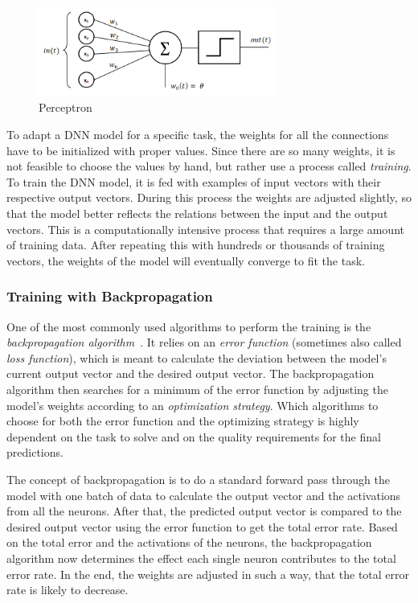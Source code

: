 \begin{figure}[h]
    \centering
    \includegraphics[width=0.7\textwidth]{images/perceptron}
    \caption{Perceptron}
    \label{fig:perceptron}
\end{figure}

To adapt a DNN model for a specific task, the weights for all the connections have to be initialized with proper values. Since there are so many weights, it is not feasible to choose the values by hand, but rather use a process called \emph{training}. To train the DNN model, it is fed with examples of input vectors with their respective output vectors. During this process the weights are adjusted slightly, so that the model better reflects the relations between the input and the output vectors. This is a computationally intensive process that requires a large amount of training data. After repeating this with hundreds or thousands of training vectors, the weights of the model will eventually converge to fit the task.

\subsubsection{Training with Backpropagation}
One of the most commonly used algorithms to perform the training is the \emph{backpropagation algorithm}~\cite[pp.~151ff]{nn_intro96}. It relies on an \emph{error function} (sometimes also called \emph{loss function}), which is meant to calculate the deviation between the model's current output vector and the desired output vector. The backpropagation algorithm then searches for a minimum of the error function by adjusting the model's weights according to an \emph{optimization strategy}. Which algorithms to choose for both the error function and the optimizing strategy is highly dependent on the task to solve and on the quality requirements for the final predictions.

The concept of backpropagation is to do a standard forward pass through the model with one batch of data to calculate the output vector and the activations from all the neurons. After that, the predicted output vector is compared to the desired output vector using the error function to get the total error rate. Based on the total error and the activations of the neurons, the backpropagation algorithm now determines the effect each single neuron contributes to the total error rate. In the end, the weights are adjusted in such a way, that the total error rate is likely to decrease.

